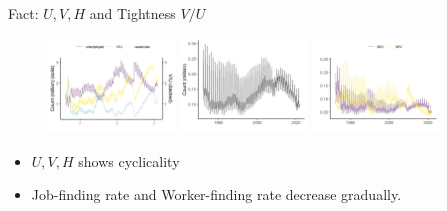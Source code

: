\documentclass[aspectratio=169]{beamer}
\begin{document}
\begin{frame}{Fact: $U,V,H$ and Tightness $V/U$}
    \begin{figure}[!ht]
  \begin{center}
  \includegraphics[width = 0.3\textwidth]
  {figuretable/unemployed_vacancy_month_aggregate.png}
  \includegraphics[width = 0.3\textwidth]
  {figuretable/hire_month_aggregate.png}
  \includegraphics[width = 0.3\textwidth]
  {figuretable/job_finding_rate_worker_finding_rate_month_aggregate.png}
  \end{center}
  \footnotesize
\end{figure} 
\begin{itemize}
    \item $U,V,H$ shows cyclicality
    \item Job-finding rate and Worker-finding rate decrease gradually.
\end{itemize}
\end{frame}
\end{document}
